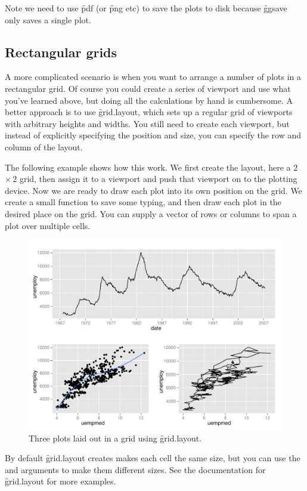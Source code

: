 Note we need to use \f{pdf} (or \f{png} etc) to save the plots to disk because \f{ggsave} only saves a single plot.

\subsection{Rectangular grids} 

A more complicated scenario is when you want to arrange a number of plots in a rectangular grid. Of course you could create a series of viewport and use what you've learned above, but doing all the calculations by hand is cumbersome. A better approach is to use \f{grid.layout}, which sets up a regular grid of viewports with arbitrary heights and widths. You still need to create each viewport, but instead of explicitly specifying the position and size, you can specify the row and column of the layout.

The following example shows how this work.  We first create the layout, here a 2\,$\times$\,2 grid, then assign it to a viewport and push that viewport on to the plotting device.  Now we are ready to draw each plot into its own position on the grid.  We create a small function to save some typing, and then draw each plot in the desired place on the grid.  You can supply a vector of rows or columns to span a plot over multiple cells.

% 
% 


\begin{figure}[htbp]
  \centering
    \includegraphics[width=\linewidth]{polishing-layout}
  \caption{Three plots laid out in a grid using \f{grid.layout}.}
  \label{fig:layout}
\end{figure}

By default \f{grid.layout} creates makes each cell the same size, but you can use the  and  arguments to make them different sizes.  See the documentation for \f{grid.layout} for more examples.


